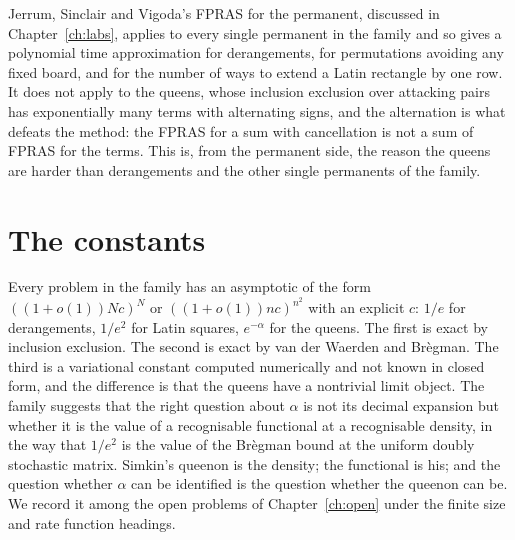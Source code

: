 Jerrum, Sinclair and Vigoda's FPRAS for the permanent, discussed in Chapter~\ref{ch:labs}, applies to every single permanent in the family and so gives a polynomial time approximation for derangements, for permutations avoiding any fixed board, and for the number of ways to extend a Latin rectangle by one row. It does not apply to the queens, whose inclusion exclusion over attacking pairs has exponentially many terms with alternating signs, and the alternation is what defeats the method: the FPRAS for a sum with cancellation is not a sum of FPRAS for the terms. This is, from the permanent side, the reason the queens are harder than derangements and the other single permanents of the family.

\section{The constants}

Every problem in the family has an asymptotic of the form $( (1 + o(1)) N c )^N$ or $( (1 + o(1)) n c )^{n^2}$ with an explicit $c$: $1/e$ for derangements, $1/e^2$ for Latin squares, $e^{-\alpha}$ for the queens. The first is exact by inclusion exclusion. The second is exact by van der Waerden and Br\`egman. The third is a variational constant computed numerically and not known in closed form, and the difference is that the queens have a nontrivial limit object. The family suggests that the right question about $\alpha$ is not its decimal expansion but whether it is the value of a recognisable functional at a recognisable density, in the way that $1/e^2$ is the value of the Br\`egman bound at the uniform doubly stochastic matrix. Simkin's queenon is the density; the functional is his; and the question whether $\alpha$ can be identified is the question whether the queenon can be. We record it among the open problems of Chapter~\ref{ch:open} under the finite size and rate function headings.
